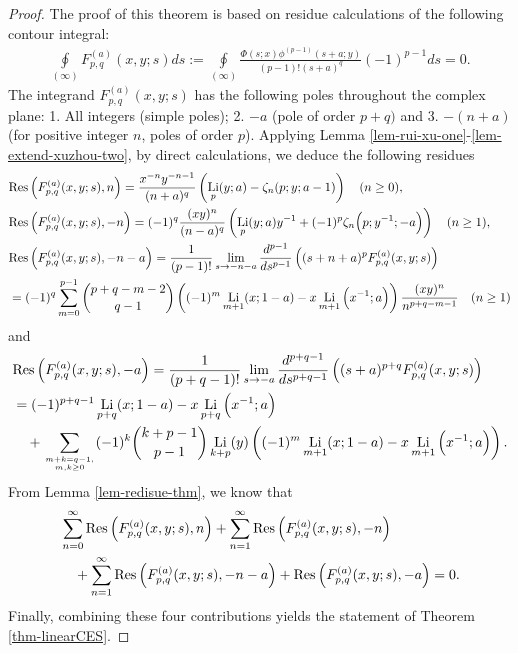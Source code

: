 \documentclass[11pt]{article}
\newcommand\Res{{\rm Res}}
\DeclareMathOperator{\Li}{Li}
\theoremstyle{plain}
\theoremstyle{definition}
\begin{document}
\begin{proof}
The proof of this theorem is based on residue calculations of the following contour integral:
\begin{align*}
\oint\limits_{\left( \infty  \right)} F^{(a)}_{p,q}(x,y;s)ds:= \oint\limits_{\left( \infty  \right)} \frac{\Phi(s;x)\phi^{(p-1)}(s+a;y)}{(p-1)!(s+a)^q} (-1)^{p-1}ds=0.
\end{align*}
The integrand $F^{(a)}_{p,q}(x,y;s)$ has the following poles throughout the complex plane: 1. All integers (simple poles); 2. $-a$ (pole of order $p+q)$ and 3. $-(n+a)$ (for positive integer $n$, poles of order $p$). Applying Lemma \ref{lem-rui-xu-one}-\ref{lem-extend-xuzhou-two}, by direct calculations, we deduce the following residues
\begin{align*}
&\Res\left(F^{(a)}_{p,q}(x,y;s),n\right)=\frac{x^{-n}y^{-n-1}}{(n+a)^q}\left(\Li_p(y;a)-\zeta_n(p;y;a-1)\right)\quad (n\geq 0),\\
&\Res\left(F^{(a)}_{p,q}(x,y;s),-n\right)=(-1)^q\frac{(xy)^n}{(n-a)^q}\left(\Li_p(y;a)y^{-1}+(-1)^p \zeta_n\Big(p;y^{-1};-a\Big)\right)\quad (n\geq 1),\\
&\Res\left(F^{(a)}_{p,q}(x,y;s),-n-a\right)=\frac1{(p-1)!} \lim_{s\rightarrow -n-a} \frac{d^{p-1}}{ds^{p-1}}\left((s+n+a)^pF^{(a)}_{p,q}(x,y;s)\right)\\
&=(-1)^q\sum_{m=0}^{p-1} \binom{p+q-m-2}{q-1} \left((-1)^m \Li_{m+1}(x;1-a)-x \Li_{m+1}\Big(x^{-1};a\Big) \right) \frac{(xy)^n}{n^{p+q-m-1}}\quad (n\geq 1)
\end{align*}
and
\begin{align*}
&\Res\left(F^{(a)}_{p,q}(x,y;s),-a\right)=\frac1{(p+q-1)!} \lim_{s\rightarrow -a} \frac{d^{p+q-1}}{ds^{p+q-1}}\left((s+a)^{p+q}F^{(a)}_{p,q}(x,y;s)\right)\\
&=(-1)^{p+q-1}\Li_{p+q}(x;1-a)-x \Li_{p+q}\Big(x^{-1};a\Big)\\
&\quad+\sum_{m+k=q-1,\atop m,k\geq 0} (-1)^k\binom{k+p-1}{p-1}\Li_{k+p}(y)\left((-1)^m \Li_{m+1}(x;1-a)-x\Li_{m+1}\Big(x^{-1};a\Big) \right).
\end{align*}
From Lemma \ref{lem-redisue-thm}, we know that
\begin{align*}
&\sum_{n=0}^\infty \Res\left(F^{(a)}_{p,q}(x,y;s),n\right)+\sum_{n=1}^\infty \Res\left(F^{(a)}_{p,q}(x,y;s),-n\right) \\
&\quad+\sum_{n=1}^\infty \Res\left(F^{(a)}_{p,q}(x,y;s),-n-a\right) +\Res\left(F^{(a)}_{p,q}(x,y;s),-a\right)=0.
\end{align*}
Finally, combining these four contributions yields the statement of Theorem \ref{thm-linearCES}.
\end{proof}
\end{document}

